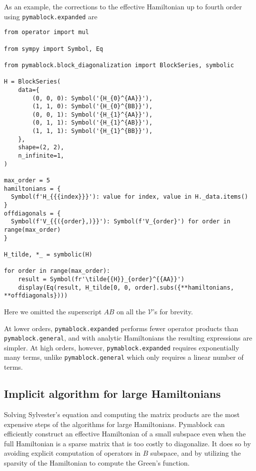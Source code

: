 \documentclass[submission, Codebases]{SciPost}
\begin{document}
{{As an example, the corrections to the effective Hamiltonian up to fourth
order using \texttt{pymablock.expanded} are

\begin{verbatim}
from operator import mul

from sympy import Symbol, Eq

from pymablock.block_diagonalization import BlockSeries, symbolic

H = BlockSeries(
    data={
        (0, 0, 0): Symbol('{H_{0}^{AA}}'),
        (1, 1, 0): Symbol('{H_{0}^{BB}}'),
        (0, 0, 1): Symbol('{H_{1}^{AA}}'),
        (0, 1, 1): Symbol('{H_{1}^{AB}}'),
        (1, 1, 1): Symbol('{H_{1}^{BB}}'),
    },
    shape=(2, 2),
    n_infinite=1,
)

max_order = 5
hamiltonians = {
  Symbol(f'H_{{{index}}}'): value for index, value in H._data.items()
}
offdiagonals = {
  Symbol(f'V_{{({order},)}}'): Symbol(f'V_{order}') for order in range(max_order)
}

H_tilde, *_ = symbolic(H)

for order in range(max_order):
    result = Symbol(fr'\tilde{{H}}_{order}^{{AA}}')
    display(Eq(result, H_tilde[0, 0, order].subs({**hamiltonians, **offdiagonals})))
\end{verbatim}

Here we omitted the superscript $AB$ on all the $\mathcal{V}$'s for brevity.

At lower orders, \texttt{pymablock.expanded} performs fewer operator
products than \texttt{pymablock.general}, and with analytic Hamiltonians
the resulting expressions are simpler.
At high orders, however, \texttt{pymablock.expanded} requires exponentially
many terms, unlike \texttt{pymablock.general} which only requires a linear
number of terms.

\subsection{Implicit algorithm for large Hamiltonians}

Solving Sylvester's equation and computing the matrix products are the most
expensive steps of the algorithms for large Hamiltonians.
Pymablock can efficiently construct an effective Hamiltonian of a small
subspace even when the full Hamiltonian is a sparse matrix that is too costly to
diagonalize.
It does so by avoiding explicit computation of operators in $B$ subspace, and by
utilizing the sparsity of the Hamiltonian to compute the Green's function.

}}
\end{document}

